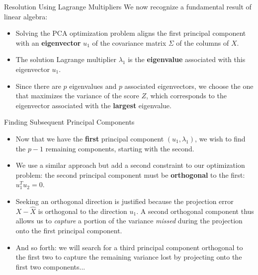 \begin{frame}{Resolution Using Lagrange Multipliers}
	We now recognize a fundamental result of linear algebra:
	\begin{itemize}
		\item Solving the PCA optimization problem aligns the first principal component with an \textbf{eigenvector} $u_1$ of the covariance matrix $\Sigma$ of the columns of $X$.
		\pause
		\item The solution Lagrange multiplier $\lambda_1$ is the \textbf{eigenvalue} associated with this eigenvector $u_1$.
		\pause
		\item Since there are $p$ eigenvalues and $p$ associated eigenvectors, we choose the one that maximizes the variance of the score $Z$, which corresponds to the eigenvector associated with the \textbf{largest} eigenvalue.
	\end{itemize}
\end{frame}

\begin{frame}{Finding Subsequent Principal Components}
	\begin{itemize}
		\item Now that we have the \textbf{first} principal component $(u_1, \lambda_1)$, we wish to find the $p-1$ remaining components, starting with the second.
		\pause
		\item We use a similar approach but add a second constraint to our optimization problem: the second principal component must be \textbf{orthogonal} to the first: $u_1^T u_2 = 0$.
		\pause
		\item Seeking an orthogonal direction is justified because the projection error $X - \hat{X}$ is orthogonal to the direction $u_1$. A second orthogonal component thus allows us to \textit{capture} a portion of the variance \textit{missed} during the projection onto the first principal component.
		\pause
		\item And so forth: we will search for a third principal component orthogonal to the first two to capture the remaining variance lost by projecting onto the first two components...
	\end{itemize}
\end{frame}

